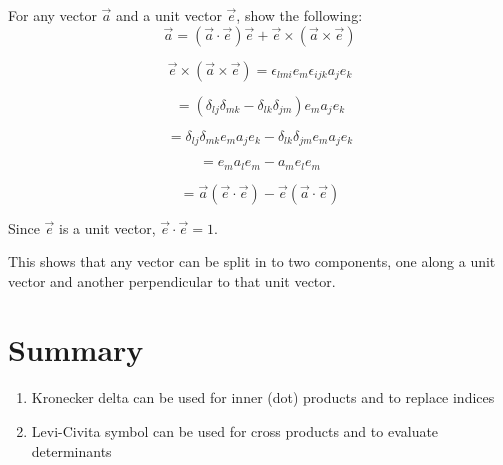 
\begin{question}
For any vector $\vec{a}$ and a unit vector $\vec{e}$, show the following:
$$ \vec{a} = \left( \vec{a} \cdot \vec{e} \right) \vec{e} + \vec{e} \times \left( \vec{a} \times \vec{e} \right) $$
\end{question}
\begin{solution}[print]

$$ \vec{e} \times \left( \vec{a} \times \vec{e} \right) = \epsilon_{lmi} e_m \epsilon_{ijk} a_j e_k $$

$$ = \left( \delta_{lj} \delta_{mk} - \delta_{lk} \delta_{jm} \right) e_m a_j e_k $$

$$ = \delta_{lj} \delta_{mk} e_m a_j e_k - \delta_{lk} \delta_{jm} e_m a_j e_k $$

$$ = e_m a_l e_m - a_m e_l e_m $$

$$ = \vec{a} \left( \vec{e} \cdot \vec{e} \right) - \vec{e} \left( \vec{a} \cdot \vec{e} \right) $$

Since $\vec{e}$ is a unit vector, $ \vec{e} \cdot \vec{e} = 1 $.

This shows that any vector can be split in to two components, one along a unit vector and another perpendicular to that unit vector.

\end{solution}



\section{Summary}

\begin{enumerate}
\item Kronecker delta can be used for inner (dot) products and to replace indices
\item Levi-Civita symbol can be used for cross products and to evaluate determinants
\end{enumerate}




